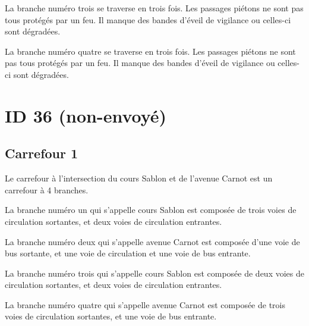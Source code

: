 \begin{appendix}
\newpar{}

La branche numéro trois se traverse en trois fois. Les passages piétons ne sont pas tous protégés par un feu. Il manque des bandes d'éveil de vigilance ou celles-ci sont dégradées.

\newpar{}

La branche numéro quatre se traverse en trois fois. Les passages piétons ne sont pas tous protégés par un feu. Il manque des bandes d'éveil de vigilance ou celles-ci sont dégradées.

\section*{ID 36 (non-envoyé)}

\label{annexe:q_ID36}

\subsection*{Carrefour 1}

\label{annexe:q_ID36_carrefour1}

Le carrefour à l'intersection du cours Sablon et de l'avenue Carnot est un carrefour à 4 branches.

\newpar{}


\newpar{}

La branche numéro un qui s'appelle cours Sablon est composée de trois voies de circulation sortantes, et deux voies de circulation entrantes.


\newpar{}

La branche numéro deux qui s'appelle avenue Carnot est composée d'une voie de bus sortante, et une voie de circulation et une voie de bus entrante.


\newpar{}

La branche numéro trois qui s'appelle cours Sablon est composée de deux voies de circulation sortantes, et deux voies de circulation entrantes.

\newpar{}

La branche numéro quatre qui s'appelle avenue Carnot est composée de trois voies de circulation sortantes, et une voie de bus entrante.


\end{appendix}
